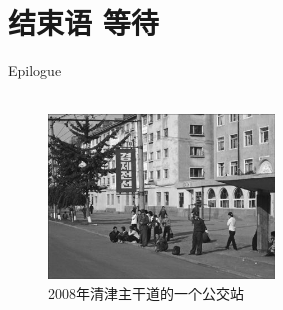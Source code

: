 \fancyhead[RO]{{\tiny{\textcolor{Gray}{\FA \ }}}\thepage}
\fancyhead[LE]{{\tiny{\textcolor{Gray}{\FA \ }}}\thepage}
\fancyfoot[LE,RO]{}
\fancyfoot[LO,CE]{}
\fancyfoot[CO,RE]{}
\chapter*{结束语 等待}
\vspace{20mm}
\begin{flushright}
	\textcolor{PinYinColor}{\EN \huge{Epilogue\\
	\ \\}}
\end{flushright}

\begin{figure}[!htbp]
	\centering
	\includegraphics[width=6cm]{./Chapters/Images/21.jpg}
	\caption*{2008年清津主干道的一个公交站}
\end{figure}

